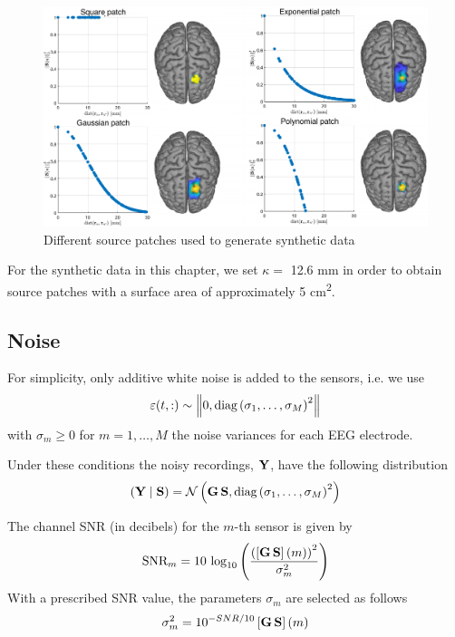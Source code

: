 \begin{figure}
\centering
\includegraphics[width=\linewidth]{./img/profiles.pdf}
\caption{Different source patches used to generate synthetic data}
\label{fig:exaple_true}
\end{figure}


For the synthetic data in this chapter, we set $\kappa = $ 12.6 \si{mm} in order to obtain source patches with a surface area of approximately 5 \si{cm^2}.

\subsection{Noise}

For simplicity, only additive white noise is added to the sensors, i.e. we use 
\begin{equation}
    \varepsilon(t,:) \sim \left\lVert 0, \text{diag}\left(  \sigma_1, \dots, \sigma_M  \right)^2 \right\rVert
\end{equation}
with $\sigma_m \geq 0$ for $m=1, \dots, M$ the noise variances for each EEG electrode.

%
Under these conditions the noisy recordings, $\mathbf{Y}$, have the following distribution
\begin{equation}
\left( \mathbf{Y} \;\middle|\; \mathbf{S} \right) =
\mathcal{N}\left(  \mathbf{G}\, \mathbf{S}, \text{diag}\left(  \sigma_1, \dots, \sigma_M  \right)^2  \right)
\end{equation}

The channel SNR (in decibels) for the $m$-th sensor is given by
\begin{equation}
\text{SNR}_m = 
10\, \log_{10}\left(  \frac{ \left(  \left[ \mathbf{G}\, \mathbf{S} \right](m) \right)^2 }{\sigma_m^2}  \right)
\end{equation}
With a prescribed SNR value, the parameters $\sigma_m$ are selected as follows
\begin{equation}
\sigma_m^2 = 
10^{{-{SNR}/{10}} }
\left[ \mathbf{G}\, \mathbf{S} \right](m)
\end{equation}

